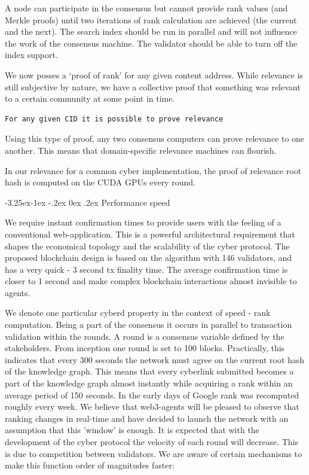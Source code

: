 \documentclass[8pt,oneside]{amsart}
\makeatletter
\newcommand{\linkgreen}[2]{\href{#1}{\color{green}{#2}}}
\renewcommand\subsection{\@startsection{subsection}{2}{\z@}%
                                     {-3.25ex\@plus -1ex \@minus -.2ex}%
                                     {0ex \@plus .2ex}%
                                     {\play\Large}}%
\newcommand{\titleSection}[1]{\subsection{#1}}
\newcommand{\code}[1]{{\PlayBold #1}}
\makeatother
\begin{document}
\begin{Abstract}
A node can participate in the consensus but cannot provide rank values (and Merkle proofs) until two iterations of rank calculation are achieved (the current and the next). The search index should be run in parallel and will not influence the work of the consensus machine. The validator should be able to turn off the index support.

We now posses a ‘proof of rank’ for any given content address. While relevance is still subjective by nature, we have a collective proof that something was relevant to a certain community at some point in time.

\begin{lstlisting}
For any given CID it is possible to prove relevance
\end{lstlisting}

Using this type of proof, any two \linkgreen{https://ipfs.io/ipfs/QmdCeixQUHBjGnKfwbB1dxf4X8xnadL8xWmmEnQah5n7x2}{IBC compatible} consensus computers can prove relevance to one another. This means that domain-specific relevance machines can flourish.

In our relevance for a common \code{cyber} implementation, the proof of relevance root hash is computed on the CUDA GPUs every round.

\titleSection{Performance speed}\label{Performance speed}

We require instant confirmation times to provide users with the feeling of a conventional web-application. This is a powerful architectural requirement that shapes the economical topology and the scalability of the cyber protocol. The proposed blockchain design is based on the \linkgreen{https://ipfs.io/ipfs/QmaMtD7xDgghqgjN62zWZ5TBGFiEjGQtuZBjJ9sMh816KJ}{Tendermint consensus} algorithm with 146 validators, and has a very quick - 3 second tx finality time. The average confirmation time is closer to 1 second and make complex blockchain interactions almost invisible to agents.

We denote one particular cyberd property in the context of speed - rank computation. Being a part of the consensus it occurs in parallel to transaction validation within the rounds. A round is a consensus variable defined by the stakeholders. From inception one round is set to 100 blocks. Practically, this indicates that every 300 seconds the network must agree on the current root hash of the knowledge graph. This means that every cyberlink submitted becomes a part of the knowledge graph almost instantly while acquiring a rank within an average period of 150 seconds. In the early days of Google rank was recomputed roughly every week. We believe that web3-agents will be pleased to observe that ranking changes in real-time and have decided to launch the network with an assumption that this 'window' is enough. It is expected that with the development of the cyber protocol the velocity of each round will decrease. This is due to competition between validators. We are aware of certain mechanisms to make this function order of magnitudes faster:


\end{Abstract}
\end{document}
